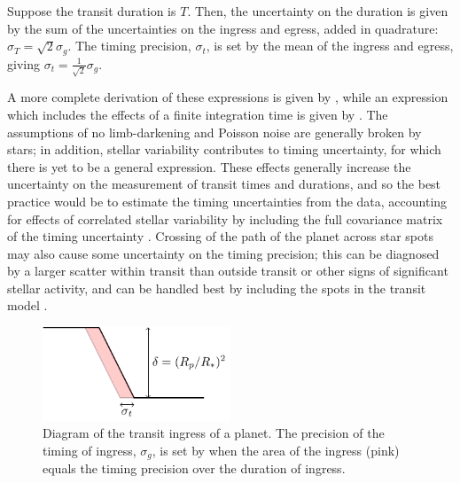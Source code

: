 \documentclass[graybox,natbib,nosecnum]{svmult}
\begin{document}
Suppose the transit duration is $T$.  Then, the uncertainty on the duration is given by
the sum of the uncertainties on the ingress and egress, added in quadrature:
$\sigma_T = \sqrt{2} \sigma_g$.  The timing precision, $\sigma_t$, is set by the mean of the ingress
and egress, giving $\sigma_t = \frac{1}{\sqrt{2}} \sigma_g$.

A more complete derivation of these expressions is given by \citet{2008ApJ...689..499C}, while an 
expression which includes the effects of a finite integration time is given by \citet{2014ApJ...794...92P}.
The assumptions of no limb-darkening and Poisson noise are generally broken by stars;  in addition,
stellar variability contributes to timing uncertainty, for which there is yet to be a general
expression.  These effects generally increase the uncertainty on the measurement of transit times
and durations, and so the best practice would be to estimate the timing uncertainties from the
data, accounting for effects of correlated stellar variability by including the full covariance
matrix of the timing uncertainty \citep{2009ApJ...704...51C,2012MNRAS.419.2683G}.  Crossing of
the path of the planet across star spots may also cause some uncertainty on the timing precision;
this can be diagnosed by a larger scatter within transit than outside transit or other signs of
significant stellar activity, and can be handled best by including the spots in the transit model 
\cite{2016A&A...585A..72I}.

\begin{figure}
\centerline{
\includegraphics[width=0.5\textwidth]{ingress.pdf}}
%
\caption{Diagram of the transit ingress of a planet.  The precision of the timing of ingress, $\sigma_g$, is set by
when the area of the ingress (pink) equals the timing precision over the duration of ingress.}
\label{fig:ingress}       %
\end{figure}

\end{document}
